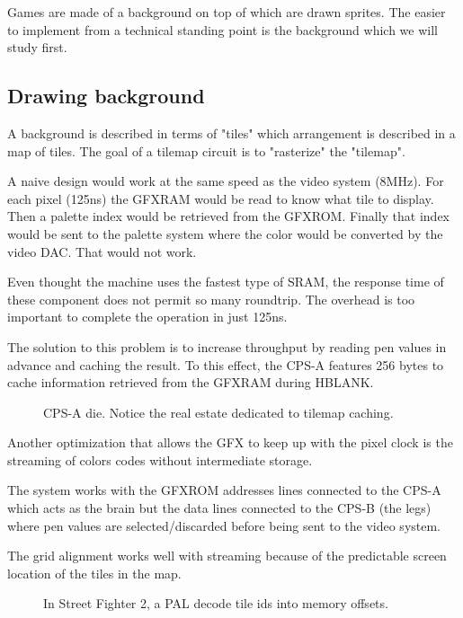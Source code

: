 Games are made of a background on top of which are drawn sprites. The easier to implement from a technical standing point is the background which we will study first.

\subsection{Drawing background}

A background is described in terms of "tiles" which arrangement is described in a map of tiles. The goal of a tilemap circuit is to "rasterize" the "tilemap".

A naive design would work at the same speed as the video system (8MHz). For each pixel (125ns) the GFXRAM would be read to know what tile to display. Then a palette index would be retrieved from the GFXROM. Finally that index would be sent to the palette system where the color would be converted by the video DAC. That would not work.

Even thought the machine uses the fastest type of SRAM, the response time of these component does not permit so many roundtrip. The overhead is too important to complete the operation in just 125ns.

The solution to this problem is to increase throughput by reading pen values in advance and caching the result. To this effect, the CPS-A features 256 bytes to cache information retrieved from the GFXRAM during HBLANK.

 \begin{figure}[H]%
 \caption*{CPS-A die. Notice the real estate dedicated to tilemap caching.}%
 \end{figure}%



Another optimization that allows the GFX to keep up with the pixel clock is the streaming of colors codes without intermediate storage. 

The system works with the GFXROM addresses lines connected to the CPS-A which acts as the brain but the data lines  connected to the CPS-B (the legs) where pen values are selected/discarded before being sent to the video system.

The grid alignment works well with streaming because of the predictable screen location of the tiles in the map.

 \begin{figure}[H]%
 \caption*{In Street Fighter 2, a PAL  decode tile ids into memory offsets.}%
 \end{figure}%

